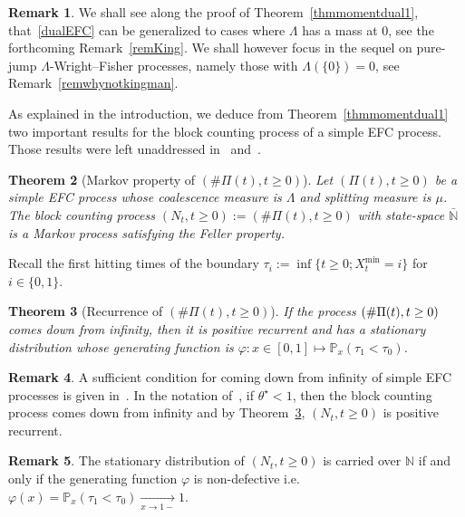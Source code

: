 \documentclass[10pt]{amsart}
\newtheorem{theo}{Theorem}[section]
\theoremstyle{definition}\newtheorem{defi}[theo]{Definition}\newtheorem{rema}[theo]{Remark}\newtheorem{exam}[theo]{Example}\newtheorem{exem}[theo]{Example}\newtheorem{nota}[theo]{Notation}
\newcommand{\bbN}{\mathbb{N}}
\newcommand{\bbP}{\mathbb{P}}
\begin{document}
\begin{rema}
We shall see along the proof of Theorem~\ref{thmmomentdual1}, that~\eqref{dualEFC} can be generalized to cases where $\Lambda$ has a mass at $0$, see the forthcoming Remark~\ref{remKing}. We shall however focus in the sequel on pure-jump $\Lambda$-Wright--Fisher processes, namely those with $\Lambda(\{0\})=0$, see Remark~\ref{remwhynotkingman}.
\end{rema}

As explained in the introduction, we deduce from Theorem~\ref{thmmomentdual1} two important results for the block counting process of a simple EFC process. Those results were left unaddressed in~\cite{cdiEFC} and~\cite{explosion}.

\begin{theo}[Markov property of $(\#\Pi(t),t\geq 0)$]\label{Markovblockcounting}
Let $(\Pi(t),t\geq 0)$ be a simple EFC process whose coalescence measure is $\Lambda$ and splitting measure is $\mu$. The block counting process $(N_t,t\geq 0):=(\#\Pi(t),t\geq 0)$ with state-space $\bar{\bbN}$ is a Markov process satisfying the Feller property.
\end{theo}

Recall the first hitting times of the boundary $\tau_i:=\inf\{t\geq 0; X_t^{\min}=i\}$ for $i\in \{0,1\}$.
\begin{theo}[Recurrence of $(\#\Pi(t),t\geq 0)$] \label{rec}
If the process $(\#\Pi(t),\linebreak t\geq 0)$ comes down from infinity, then it is positive recurrent and has a stationary distribution whose generating function is $\varphi:x\in [0,1] \mapsto \bbP_x(\tau_1<\tau_0)$.
\end{theo}

\begin{rema}
A sufficient condition for coming down from infinity of simple EFC processes is given in~\cite[Theorem~1.1]{cdiEFC}. In the notation of~\cite{cdiEFC}, if $\theta^{\star}<1$, then the block counting process comes down from infinity and by Theorem~\ref{rec}, $(N_t,t\geq 0)$ is positive recurrent.
\end{rema}

\begin{rema}
The stationary distribution of $(N_t,t\geq 0)$ is carried over $\bbN$ if and only if the generating function $\varphi$ is non-defective i.e. $\varphi(x)=\bbP_x(\tau_1<\tau_0)\underset{x\rightarrow 1-}{\longrightarrow} 1$.
\end{rema}
\end{document}
